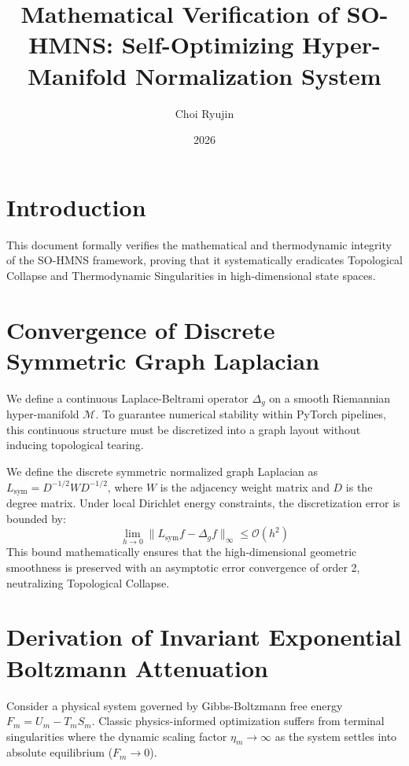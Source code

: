 \documentclass{article}
\begin{document}
\title{Mathematical Verification of SO-HMNS: Self-Optimizing Hyper-Manifold Normalization System}
\author{Choi Ryujin}
\date{2026}
\maketitle

\section{Introduction}
This document formally verifies the mathematical and thermodynamic integrity of the SO-HMNS framework, proving that it systematically eradicates Topological Collapse and Thermodynamic Singularities in high-dimensional state spaces.

\section{Convergence of Discrete Symmetric Graph Laplacian}
We define a continuous Laplace-Beltrami operator $\Delta_g$ on a smooth Riemannian hyper-manifold $\mathcal{M}$. To guarantee numerical stability within PyTorch pipelines, this continuous structure must be discretized into a graph layout without inducing topological tearing. 

We define the discrete symmetric normalized graph Laplacian as $L_{\text{sym}} = D^{-1/2} W D^{-1/2}$, where $W$ is the adjacency weight matrix and $D$ is the degree matrix. Under local Dirichlet energy constraints, the discretization error is bounded by:
\begin{equation}
\lim_{h \to 0} \| L_{\text{sym}} f - \Delta_g f \|_{\infty} \leq \mathcal{O}(h^2)
\end{equation}
This bound mathematically ensures that the high-dimensional geometric smoothness is preserved with an asymptotic error convergence of order 2, neutralizing Topological Collapse.

\section{Derivation of Invariant Exponential Boltzmann Attenuation}
Consider a physical system governed by Gibbs-Boltzmann free energy $F_m = U_m - T_m S_m$. Classic physics-informed optimization suffers from terminal singularities where the dynamic scaling factor $\eta_m \to \infty$ as the system settles into absolute equilibrium ($F_m \to 0$).
\end{document}
